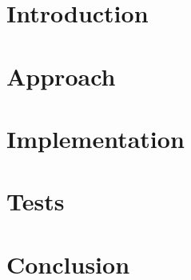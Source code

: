 \documentclass[a4paper, english, 10pt]{report}
\begin{document}
\chapter{Introduction}
\label{ch:Introduction}


\chapter{Approach}
\label{ch:Approach}


\chapter{Implementation}
\label{ch:Implementation}


\chapter{Tests}
\label{ch:Tests}


\chapter{Conclusion}
\label{ch:Conclusion}






\begin{appendices}

\end{appendices}
\end{document}
